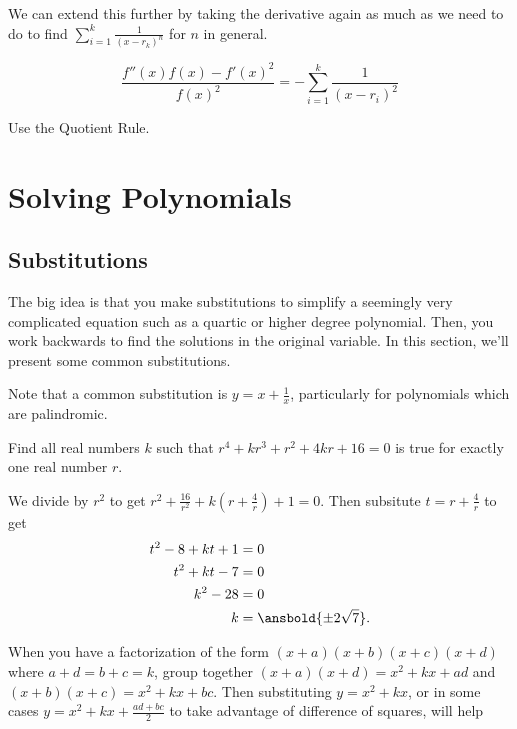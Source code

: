 \documentclass[mast]{lucky}
\begin{document}
We can extend this further by taking the derivative again as much as we need to do to find $\sum_{i=1}^{k} \frac{1}{(x-r_{k})^n}$ for $n$ in general.
\begin{theo}
$$\frac{f''(x)f(x)-f'(x)^2}{f(x)^2} = -\sum_{i=1}^{k} \frac{1}{(x-r_{i})^2}$$
\end{theo}

\begin{pro}
Use the Quotient Rule.
\end{pro}
\newpage

\section{Solving Polynomials}
\subsection{Substitutions}
The big idea is that you make substitutions to simplify a seemingly very complicated equation such as a quartic or higher degree polynomial. Then, you work backwards to find the solutions in the original variable. In this section, we'll present some common substitutions.


Note that a common substitution is $y=x+\frac{1}{x}$, particularly for polynomials which are palindromic.

\begin{exam}
Find all real numbers $k$ such that $r^4+kr^3+r^2+4kr+16=0$ is true for exactly one real number $r$.
\end{exam}

\begin{sol}
We divide by $r^2$ to get $r^2+\frac{16}{r^2} + k(r+\frac{4}{r})+1=0$. Then subsitute $t=r+\frac{4}{r}$ to get
\begin{align*}
t^2-8+kt+1 &= 0\\
t^2+kt-7&=0\\
k^2-28&=0\\
k &= \ansbold{\pm 2\sqrt{7}}.
\end{align*}
\end{sol}

When you have a factorization of the form $(x+a)(x+b)(x+c)(x+d)$ where $a+d=b+c=k$, group together $(x+a)(x+d)=x^2+kx+ad$ and $(x+b)(x+c)=x^2+kx+bc$. Then substituting $y=x^2+kx$, or in some cases $y=x^2+kx+\frac{ad+bc}{2}$ to take advantage of difference of squares, will help
\end{document}
